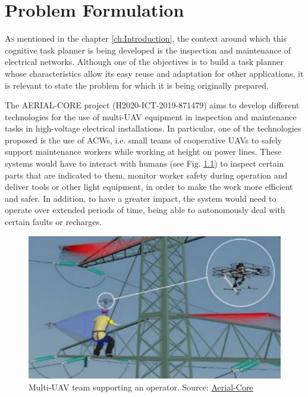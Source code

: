 \chapter{Problem Formulation}
\label{ch:ProblemFormulation}
\lettrine[lraise=-0.1, lines=2, loversize=0.2]{A}{s} mentioned in the chapter \ref{ch:Introduction}, the context around which this cognitive task planner is being developed is the inspection and maintenance of electrical networks. Although one of the objectives is to build a task planner whose characteristics allow its easy reuse and adaptation for other applications, it is relevant to state the problem for which it is being originally prepared. 

The AERIAL-CORE project (H2020-ICT-2019-871479) aims to develop different technologies for the use of multi-\gls{UAV} equipment in inspection and maintenance tasks in high-voltage electrical installations. In particular, one of the technologies proposed is the use of \glspl{ACW}, i.e. small teams of cooperative \glspl{UAV} to safely support maintenance workers while working at height on power lines. These systems would have to interact with humans (see Fig. \ref{fig:aerial_co_worker}) to inspect certain parts that are indicated to them, monitor worker safety during operation and deliver tools or other light equipment, in order to make the work more efficient and safer. In addition, to have a greater impact, the system would need to operate over extended periods of time, being able to autonomously deal with certain faults or recharges.

\begin{figure}[htbp]
    \centering
    \includegraphics[width=1\linewidth]
    {ProblemFormulation/figures/aerial_co_worker.jpeg}
    \caption{Multi-\gls{UAV} team supporting an operator. Source: \href{https://aerial-core.eu/}{Aerial-Core}}
    \label{fig:aerial_co_worker}
\end{figure}

